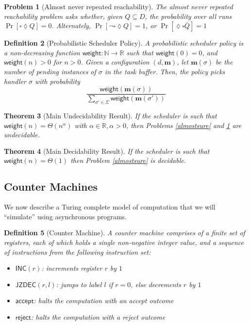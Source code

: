 \documentclass{article}
\newtheorem{definition}{Definition}[section]
\newtheorem{problem}[definition]{Problem}
\newtheorem{theorem}[definition]{Theorem}
\theoremstyle{remark}
\newcommand{\naturals}{\mathbb{N}}
\newcommand{\reals}{\mathbb{R}}
\newcommand{\weight}{\mathsf{weight}}
\newcommand{\inc}{\mathsf{INC}}
\newcommand{\jzdec}{\mathsf{JZDEC}}
\newcommand{\accept}{\mathsf{accept}}
\newcommand{\reject}{\mathsf{reject}}
\begin{document}
\begin{problem}[Almost never repeated reachability]
\label{almostnever}
The almost never repeated reachability problem asks whether, given $Q \subseteq D$, the probability over all runs $\Pr[\square \lozenge Q] = 0$. Alternately, $\Pr[\neg \square \lozenge Q] = 1$, or $\Pr[\lozenge \square \bar{Q}] = 1$
\end{problem}

\begin{definition}[Probabilistic Scheduler Policy]
A probabilistic scheduler policy is a non-decreasing function $\weight: \naturals \rightarrow \reals$ such that $\weight(0) = 0$, and $\weight(n) > 0$ for $n > 0$. Given a configuration $(d, \mathbf{m})$, let $\mathbf{m}(\sigma)$ be the number of pending instances of $\sigma$ in the task buffer. Then, the policy picks handler $\sigma$ with probability $$\frac{\weight(\mathbf{m}(\sigma))}{\sum_{\sigma' \in \Sigma}\weight(\mathbf{m}(\sigma'))}$$
\end{definition}


\begin{theorem}[Main Undecidability Result]
\label{thm:undec}
If the scheduler is such that $\weight(n) = \Theta(n^\alpha)$ with $\alpha \in 
\reals, \alpha > 0$, then Problems \ref{almostsure} and \ref{almostnever} are undecidable.
\end{theorem}

\begin{theorem}[Main Decidability Result]
\label{thm:dec}
If the scheduler is such that $\weight(n) = \Theta(1)$ then Problem \ref{almostsure} is decidable.
\end{theorem}

\subsection{Counter Machines}
We now describe a Turing complete model of computation that we will ``simulate'' using asynchronous programs.

\begin{definition}[Counter Machine]
A counter machine comprises of a finite set of registers, each of which holds a single non-negative integer value, and a sequence of instructions from the following instruction set:
\begin{itemize}
\item $\inc(r)$: increments register $r$ by $1$
\item $\jzdec(r, l)$: jumps to label $l$ if $r = 0$, else decrements $r$ by $1$
\item $\accept$: halts the computation with an accept outcome
\item $\reject$: halts the computation with a reject outcome
\end{itemize}
\end{definition}
\end{document}

